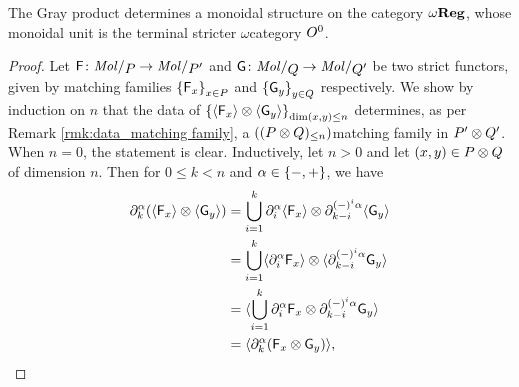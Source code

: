 \begin{prop} \label{prop:gray_stricter_regular_complex_monoidal}
    The Gray product determines a monoidal structure on the category \( \omegaReg \), whose monoidal unit is the terminal stricter \( \omega \)\nbd category \( \globe{0} \).
\end{prop}
\begin{proof}
    Let \( \F \colon \molecin{P} \to \molecin{P'} \) and \( \G \colon \molecin{Q} \to \molecin{Q'} \) be two strict functors, given by matching families \( \set{\F_x}_{x \in P} \) and \( \set{\G_y}_{y \in Q} \) respectively.
    We show by induction on \( n \) that the data of \( \set{\pcell{\F_x} \gray \pcell{\G_y}}_{\dim (x, y) \le n} \) determines, as per Remark \ref{rmk:data_matching family}, a \( (\gr{\le n}{(P \gray Q)}) \)\nbd matching family in \( P' \gray Q' \).
    When \( n = 0 \), the statement is clear. 
    Inductively, let \( n > 0 \) and let \( (x, y) \in P \gray Q \) of dimension \( n \). 
    Then for \( 0 \le k < n \) and \( \a \in \set{-, +} \), we have
    \begin{align*}
        \bd{k}{\a} (\pcell{\F_x} \gray \pcell{\G_y}) &= \bigcup_{i = 1}^k \bd{i}{\a} \pcell{\F_x} \gray \bd{k - i}{(-)^i\a} \pcell{\G_y} \\
                                       &= \bigcup_{i = 1}^k \pcell{\bd{i}{\a} \F_x} \gray \pcell{\bd{k - i}{(-)^i\a} \G_y} \\
                                       &= \pcell{\bigcup_{i = 1}^k \bd{i}{\a} \F_x \gray \bd{k - i}{(-)^i\a} \G_y} \\
                                       &= \pcell{\bd{k}{\a} (\F_x \gray \G_y)},
    \end{align*}


\end{proof}
